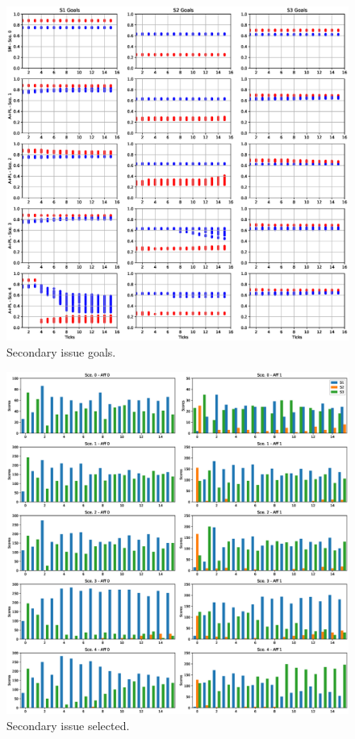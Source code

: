 \documentclass[12pt]{article}
\begin{document}
\begin{figure}
\centering
\includegraphics[width = 0.95\linewidth, angle = 0]{figures/PE_PL_SGoals_+PL}
\caption{Secondary issue goals.}
\label{fig:PE_PL_SGoals}
\end{figure}

\begin{figure}
\centering
\includegraphics[width = 0.95\linewidth, angle = 0]{figures/PE_PL_SSelected_+PL}
\caption{Secondary issue selected.}
\label{fig:PE_PL_SSelected}
\end{figure}
\end{document}
